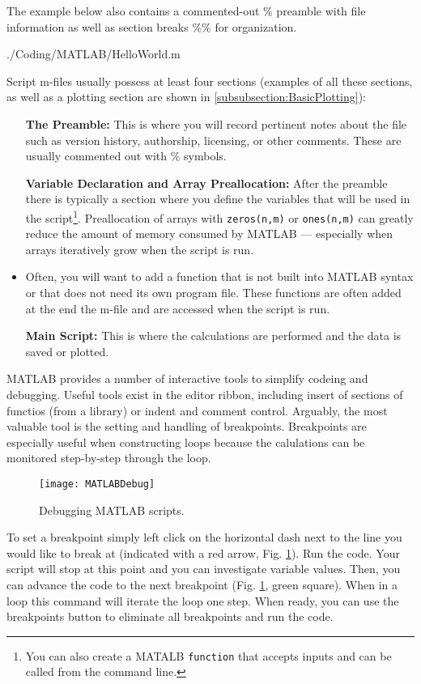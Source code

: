 The example below also contains a commented-out \% preamble with file information as well as section breaks \%\% for organization. 

				
				{./Coding/MATLAB/HelloWorld.m}
				
Script m-files usually possess at least four sections (examples of all these sections, as well as a plotting section are shown in \ref{subsubsection:BasicPlotting}):

\begin{itemize}[align=left]
	\item [\textbf{The Preamble:}] This is where you will record pertinent notes about the file such as version history, authorship, licensing, or other comments. These are usually commented out with \% symbols. 
	\item [\textbf{Variable Declaration and Array Preallocation:}] After the preamble there is typically a section where you define the variables that will be used in the script\footnote{You can also create a MATALB {\lstinline[style=Matlab-editor]!function!} that accepts inputs and can be called from the command line.}. Preallocation of arrays with {\lstinline[style=Matlab-editor]!zeros(n,m)!} or {\lstinline[style=Matlab-editor]!ones(n,m)!} can greatly reduce the amount of memory consumed by MATLAB --- especially when arrays iteratively grow when the script is run.  
		\item [\textbf{Anonymous Function:}] Often, you will want to add a function that is not built into MATLAB syntax or that does not need its own program file. These functions are often added at the end the m-file and are accessed when the script is run.
	\item [\textbf{Main Script:}] This is where the calculations are performed and the data is saved or plotted.
\end{itemize}

MATLAB provides a number of interactive tools to simplify codeing and debugging. Useful tools exist in the editor ribbon, including insert of sections of functios (from a library) or indent and comment control. Arguably, the most valuable tool is the setting and handling of breakpoints. Breakpoints are especially useful when constructing loops because the calulations can be monitored step-by-step through the loop.

\begin{figure}[b!]%
	\centering
	\texttt{[image: MATLABDebug]}%
	\caption{Debugging MATLAB scripts.}%
	\label{fig:Breakpoint}%
\end{figure}

To set a breakpoint simply left click on the horizontal dash next to the line you would like to break at (indicated with a red arrow, Fig. \ref{fig:Breakpoint}). Run the code. Your script will stop at this point and you can investigate variable values. Then, you can advance the code to the next breakpoint (Fig. \ref{fig:Breakpoint}, green square). When in a loop this command will iterate the loop one step. When ready, you can use the breakpoints button to eliminate all breakpoints and run the code.



		
